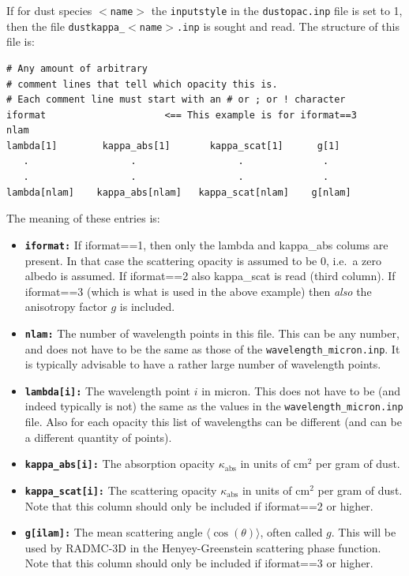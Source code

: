 \documentclass{report}
\newenvironment{asciibox}%
  {\begin{list}{}{%
    \setlength{\topsep}{0.5em}%
    \setlength{\parskip}{0em}%
    \setlength{\parsep}{0em}%
    \setlength{\itemsep}{0em}%
    \setlength{\rightmargin}{0em}%
    \setlength{\leftmargin}{3.0em}%
    \setlength{\labelsep}{1em}%
    \setlength{\labelwidth}{2em}%
  }\normalfont\footnotesize\item}
  {\end{list}}
\begin{document}
If for dust species {\small\tt $<$name$>$} the {\small\tt inputstyle} in the 
{\small\tt dustopac.inp} file is set to 1, then the file 
{\small\tt dustkappa\_$<$name$>$.inp}
is sought and read. The structure of this file is:
\begin{asciibox}\begin{verbatim}
# Any amount of arbitrary
# comment lines that tell which opacity this is.
# Each comment line must start with an # or ; or ! character
iformat                     <== This example is for iformat==3
nlam
lambda[1]        kappa_abs[1]       kappa_scat[1]      g[1]
   .                  .                  .              .
   .                  .                  .              .
lambda[nlam]    kappa_abs[nlam]   kappa_scat[nlam]    g[nlam]
\end{verbatim}\end{asciibox}
The meaning of these entries is:
\begin{itemize}
\item[] {\small\tt\bf iformat:} If iformat==1, then only the lambda and
  kappa\_abs colums are present. In that case the scattering opacity is
  assumed to be 0, i.e.\ a zero albedo is assumed. If iformat==2 also
  kappa\_scat is read (third column). If iformat==3 (which is what is used in
  the above example) then {\em also} the anisotropy factor $g$ is included.
\item[] {\small\tt\bf nlam:} The number of wavelength points in this file. This
  can be any number, and does not have to be the same as those of the
  {\small\tt wavelength\_micron.inp}. It is typically advisable to have a rather
  large number of wavelength points.
\item[] {\small\tt\bf lambda[i]:} The wavelength point $i$ in micron. This does
  not have to be (and indeed typically is not) the same as the values in the
  {\small\tt wavelength\_micron.inp} file. Also for each opacity this list of
  wavelengths can be different (and can be a different quantity of points).
\item[] {\small\tt\bf kappa\_abs[i]:} The absorption opacity $\kappa_{\mathrm{abs}}$ in units of cm$^2$ per gram of dust.
\item[] {\small\tt\bf kappa\_scat[i]:} The scattering opacity $\kappa_{\mathrm{abs}}$ in units of cm$^2$
  per gram of dust. Note that this column should only be included if 
  iformat==2 or higher. 
\item[] {\small\tt\bf g[ilam]:} The mean scattering angle
  $\langle\cos(\theta)\rangle$, often called $g$. This will be used by
  RADMC-3D in the Henyey-Greenstein scattering phase function. Note that
  this column should only be included if iformat==3 or higher.
\end{itemize}
\end{document}

